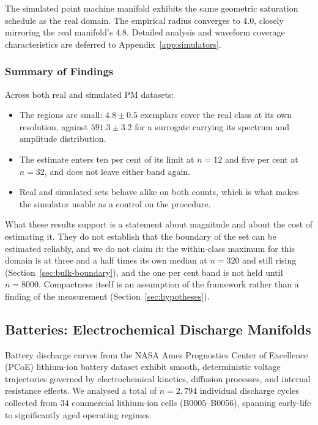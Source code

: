 \documentclass[10pt]{article}
\theoremstyle{plain}
\theoremstyle{definition}
\theoremstyle{remark}
\begin{document}

The simulated point machine manifold exhibits the same geometric saturation schedule as the real domain. The empirical radius converges to 4.0, closely mirroring the real manifold's 4.8. Detailed analysis and waveform coverage characteristics are deferred to Appendix~\ref{app:simulators}.

\subsubsection{Summary of Findings}

Across both real and simulated PM datasets:
\begin{itemize}
    \item The regions are small: $4.8 \pm 0.5$ exemplars cover the real class
    at its own resolution, against $591.3 \pm 3.2$ for a surrogate carrying its
    spectrum and amplitude distribution.
    \item The estimate enters ten per cent of its limit at $n=12$ and five
    per cent at $n=32$, and does not leave either band again.
    \item Real and simulated sets behave alike on both counts, which is what
    makes the simulator usable as a control on the procedure.
\end{itemize}

What these results support is a statement about magnitude and about the cost of
estimating it. They do not establish that the boundary of the set can be
estimated reliably, and we do not claim it: the within-class maximum for this
domain is at three and a half times its own median at $n=320$ and still rising
(Section~\ref{sec:bulk-boundary}), and the one per cent band is not held until
$n=8000$. Compactness itself is an assumption of the framework rather than a
finding of the measurement (Section~\ref{sec:hypotheses}).

\subsection{Batteries: Electrochemical Discharge Manifolds}
\label{sec:results-battery}

Battery discharge curves from the NASA Ames Prognostics Center of Excellence (PCoE)
lithium-ion battery dataset exhibit smooth, deterministic voltage trajectories
governed by electrochemical kinetics, diffusion processes, and internal resistance
effects. We analysed a total of $n = 2{,}794$ individual discharge cycles collected
from $34$ commercial lithium-ion cells (B0005--B0056), spanning early-life to
significantly aged operating regimes.
\end{document}
